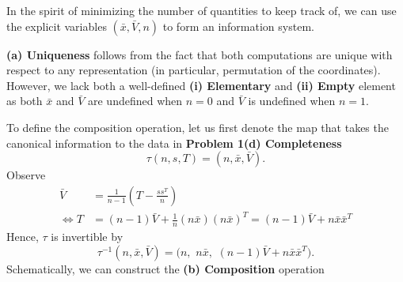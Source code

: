 \documentclass{homework}
\begin{document}

\begin{solution}
  In the spirit of minimizing the number of quantities to keep track of, we can use the explicit variables $(\bar x, \bar V, n)$ to form an information system. 

  \textbf{(a) Uniqueness} follows from the fact that both computations are unique with respect to any representation (in particular, permutation of the coordinates). 
  However, we lack both a well-defined \textbf{(i) Elementary} and \textbf{(ii) Empty} element as both $\bar x$ and $\bar V$ are undefined when $n = 0$ and $\bar V$ is undefined when $n=1$.

  To define the composition operation, let us first denote the map that takes the canonical information to the data in \textbf{Problem 1(d) Completeness}
  $$
    \tau(n,s,T) = (n,\bar x, \bar V).
  $$
  Observe 
  \begin{align*}
    \bar V &= \frac 1{n-1}\left( T - \frac{ss^T}{n}\right) \\
    \iff T &= (n-1)\bar V + \frac 1n (n\bar x)(n\bar x)^T = (n-1)\bar V + n \bar x \bar x^T
  \end{align*}
  Hence, $\tau$ is invertible by
  $$
  \tau^{-1}(n,\bar x,\bar V) = \Big(n,\,\, n \bar x,\,\, (n-1)\bar V + n \bar x\bar x^T \Big).
  $$
  Schematically, we can construct the \textbf{(b) Composition} operation 
  \begin{center}
\end{center}
\end{solution}
\end{document}
